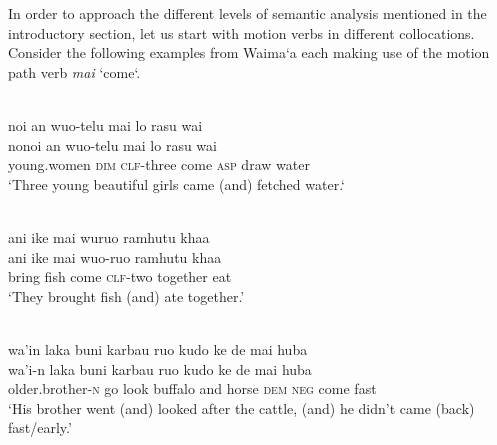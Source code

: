 In order to approach the different levels of semantic analysis mentioned in the introductory section, let us start with motion verbs in different collocations. Consider the following examples from Waima`a each making use of the motion path verb \textit{mai} `come`. 

\ea \label{WMH_Julio_goat099}
\\
\glll noi an wuo-telu mai lo rasu wai \\
nonoi an wuo-telu mai lo rasu wai \\
young.women \textsc{dim} \textsc{clf}-three come \textsc{asp} draw water\\
\glft `Three young beautiful girls came (and) fetched water.`\\ 
\z

\ea \label{WMH_Julio_goat049}
\\
\glll ani ike mai wuruo ramhutu khaa \\
ani ike mai wuo-ruo ramhutu khaa \\
bring fish come \textsc{clf}-two together eat\\
\glft `They brought fish (and) ate together.'\\
\z

\ea \label{WMH_Julio_goat057}
\\
\glll wa'in laka buni karbau ruo kudo ke de mai huba \\
wa'i-n laka buni karbau ruo kudo ke de mai huba \\
older.brother-\textsc{n} go look buffalo and horse \textsc{dem} \textsc{neg} come fast\\
\glft `His brother went (and) looked after the cattle, (and) he didn't came (back) fast/early.'\\
\z

